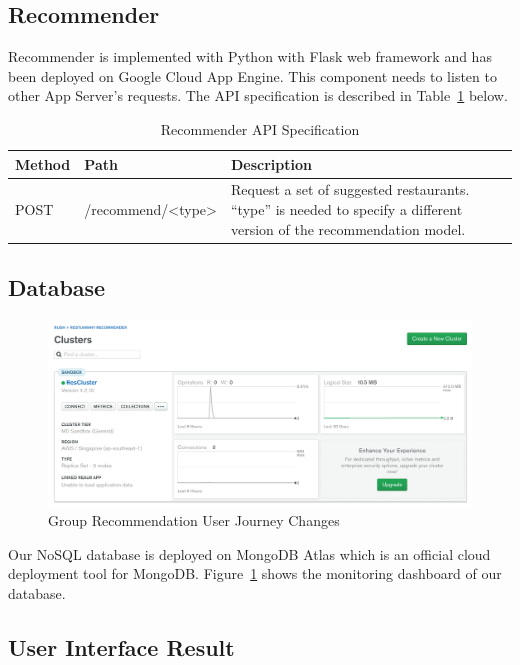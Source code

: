\documentclass[12pt,oneside,openright,a4paper]{cpe-english-project}
\begin{document}
\subsection{Recommender}

Recommender is implemented with Python with Flask web framework and has been deployed on Google Cloud App Engine. This component needs to listen to other App Server’s requests. The API specification is described in Table~\ref{tbl:4RecommenderAPISpecification} below.

\begin{table}[H]
\caption{Recommender API Specification}\label{tbl:4RecommenderAPISpecification}
\begin{tabularx}{\textwidth}{l|l|X} \hline\hline
Method & Path & Description \\ \hline\hline
POST & /recommend/<type> & Request a set of suggested restaurants. “type” is needed to specify a different version of the recommendation model. \\ \hline\hline
\end{tabularx}
\end{table}

\subsection{Database}

\begin{figure}[H]\centering
\includegraphics[width=400pt]{./images/4mongodashboard.png}
\caption{Group Recommendation User Journey Changes}\label{fig:4mongodashboard}
\end{figure}

Our NoSQL database is deployed on MongoDB Atlas which is an official cloud deployment tool for MongoDB. Figure~\ref{fig:4mongodashboard} shows the monitoring dashboard of our database.


\subsection{User Interface Result}
\end{document}
